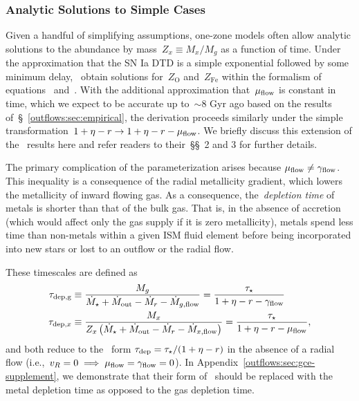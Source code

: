 \subsubsection{Analytic Solutions to Simple Cases}
\label{outflows:sec:gce:onezone:analytic}
Given a handful of simplifying assumptions, one-zone models often allow
analytic solutions to the abundance by mass~$Z_x \equiv M_x / M_g$ as a
function of time.
Under the approximation that the SN Ia DTD is a simple exponential followed by
some minimum delay,~\citet{Weinberg2017b} obtain solutions for~$Z_\text{O}$
and~$Z_\text{Fe}$ within the formalism of equations~
and~.
With the additional approximation that~$\mu_{\text{flow}}$ is constant in time, which
we expect to be accurate up to~$\sim$8 Gyr ago based on the results
of~\S~\ref{outflows:sec:empirical}, the derivation proceeds similarly under the
simple transformation~$1 + \eta - r \rightarrow 1 + \eta - r - \mu_{\text{flow}}$.
We briefly discuss this extension of the~\citet{Weinberg2017b} results here and
refer readers to their~\S\S~2 and 3 for further details.
\par
The primary complication of the parameterization arises because
$\mu_{\text{flow}} \neq \gamma_{\text{flow}}$.
This inequality is a consequence of the radial metallicity gradient, which
lowers the metallicity of inward flowing gas.
As a consequence, the~\textit{depletion time} of metals is shorter than that of
the bulk gas.
That is, in the absence of accretion (which would affect only the gas supply if
it is zero metallicity), metals spend less time than non-metals within a given
ISM fluid element before being incorporated into new stars or lost to an
outflow or the radial flow.
\par
These timescales are defined as
\begin{subequations}\begin{align}
\tau_\text{dep,g} &\equiv \frac{M_g}{
	\dot{M}_\star + \dot{M}_\text{out} - \dot{M}_r - \dot{M}_{g,\text{flow}}
} = \frac{\tau_\star}{1 + \eta - r - \gamma_{\text{flow}}}
\\
\tau_\text{dep,$x$} &\equiv \frac{M_x}{
	Z_x\left(\dot{M}_\star + \dot{M}_\text{out} - \dot{M}_r - \dot{M}_{x,\text{flow}}
	\right)
} = \frac{\tau_\star}{1 + \eta - r - \mu_{\text{flow}}},
\end{align}\end{subequations}
and both reduce to the~\citet{Weinberg2017b} form
$\tau_\text{dep} = \tau_\star / (1 + \eta - r)$ in the absence of a radial
flow (i.e.,~$v_R = 0 \implies \mu_{\text{flow}} = \gamma_{\text{flow}} = 0$).
In Appendix~\ref{outflows:sec:gce-supplement}, we demonstrate that their form
of~ should be replaced with the metal depletion time as opposed
to the gas depletion time.

